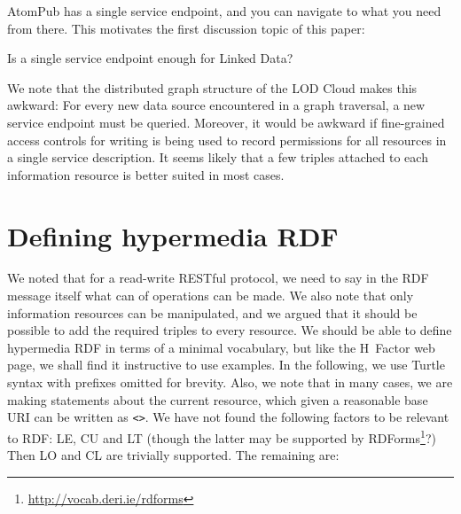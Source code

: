 \documentclass{llncs}
\begin{document}
AtomPub has a single service endpoint,
and you can navigate to what you need from there. This motivates the
first discussion topic of this paper:

\begin{question}
Is a single service endpoint enough for Linked Data?
\end{question}

We note that the distributed graph structure of the LOD Cloud makes
this awkward: For every new data source encountered in a graph
traversal, a new service endpoint must be queried. Moreover, it would
be awkward if fine-grained access controls for writing is being used
to record permissions for all resources in a single service
description. It seems likely that a few triples attached to each
information resource is better suited in most cases.

\section{Defining hypermedia RDF}

We noted that for a read-write RESTful protocol, we need to say in the
RDF message itself what can of operations can be made. We also note
that only information resources can be manipulated, and we argued that
it should be possible to add the required triples to every
resource. We should be able to define hypermedia RDF in terms of a
minimal vocabulary, but like the H~Factor web page, we shall find it
instructive to use examples. In the following, we use Turtle syntax
with prefixes omitted for brevity. Also, we note that in many cases,
we are making statements about the current resource, which given a
reasonable base URI can be written as \texttt{<>}. We have not found
the following factors to be relevant to RDF: \textsf{LE}, \textsf{CU}
and \textsf{LT} (though the latter may be supported by
RDForms\footnote{\url{http://vocab.deri.ie/rdforms}}?)  Then
\textsf{LO} and \textsf{CL} are trivially supported. The remaining are:
\end{document}
